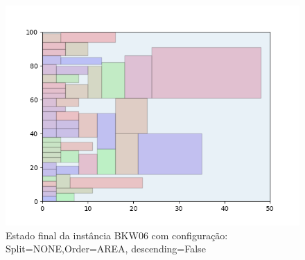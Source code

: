 \begin{figure}[H]
    \centering
    \caption[]{Estado final da instância BKW06 com configuração: Split=NONE,Order=AREA, descending=False}
    \label{fig:bkw06-none-area-false}
    \includegraphics[scale=0.5]{output/figures/bkw/bkw06/none/area/false/00}
\end{figure}